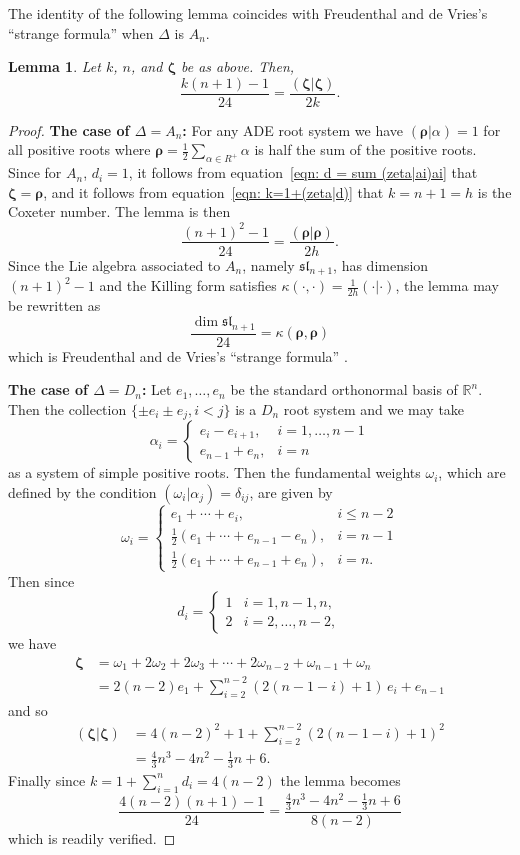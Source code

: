 \documentclass{amsart}
\newtheorem{lemma}[theorem]{Lemma}
\theoremstyle{definition}
\newcommand{\half}{\frac{1}{2}}
\newcommand{\RR} {{\mathbb R}}		%
\newcommand{\zetavec}{\bm{\zeta }}
\newcommand{\rhovec}{\bm{\rho }}
\begin{document}
The identity of the following lemma coincides with Freudenthal and de Vries's
``strange formula'' when $\Delta$ is $A_{n}$. 
\begin{lemma}\label{lem: another strange formula}
Let $k$, $n$, and $\zetavec$ be as above. Then,
\[
\frac{k(n+1)-1}{24} =\frac{(\zetavec |\zetavec )}{2k} . 
\]
\end{lemma}
\begin{proof}
\textbf{The case of $\Delta =A_{n}$:}
For any ADE root system we have $(\rhovec |\alpha )=1$ for all positive
roots where $\rhovec =\half \sum_{\alpha \in R^{+}}\alpha$ is half the
sum of the positive roots. Since for $A_{n}$, $d_{i}=1$, it follows
from equation~\eqref{eqn: d = sum (zeta|ai)ai} that $\zetavec
=\rhovec$, and it follows from equation~\eqref{eqn: k=1+(zeta|d)}
that $k=n+1=h$ is the Coxeter number. The lemma is then
\[
\frac{(n+1)^{2}-1}{24} = \frac{(\rhovec |\rhovec )}{2h}.
\]
Since the Lie algebra associated to $A_{n}$, namely $\mathfrak{sl}_{n+1}$,
has dimension $(n+1)^{2}-1$ and the Killing form satisfies $\kappa
(\cdot ,\cdot )=\frac{1}{2h}(\cdot |\cdot )$, the lemma may be
rewritten as
\[
\frac{\dim \mathfrak{sl}_{n+1}}{24} =\kappa (\rhovec ,\rhovec )
\]
which is Freudenthal and de Vries's ``strange formula''
\cite[47.11]{freudenthal1969linear}.

\bigskip
\textbf{The case of $\Delta =D_{n}$:} Let $e_{1},\dotsc ,e_{n}$ be the
standard orthonormal basis of $\RR^{n}$. Then the collection $\{\pm
e_{i} \pm e_{j}, i<j \}$ is a $D_{n}$ root system and we may take 
\[
\alpha_{i} = \begin{cases}
e_{i}-e_{i+1},& i=1,\dotsc ,n-1\\
e_{n-1}+e_{n},&i=n
\end{cases}
\]
as a system of simple positive roots. Then the fundamental weights
$\omega_{i}$, which are defined by the condition $(\omega_{i}
|\alpha_{j}) = \delta_{ij} $, are given by \cite[Appendix C]{Knapp}
\[
\omega_{i} = \begin{cases}
e_{1}+\dotsb +e_{i},& i\leq n-2\\
\half (e_{1}+\dotsb +e_{n-1}-e_{n}),& i=n-1\\
\half (e_{1}+\dotsb +e_{n-1}+e_{n}),& i=n.
\end{cases}
\]
Then since
\[
d_{i}=\begin{cases}
1&i=1,n-1,n,\\
2&i=2,\dotsc , n-2,
\end{cases}
\]
we have
\begin{align*}
\zetavec & = \omega_{1}+2\omega_{2}+2\omega_{3}+\dotsb +2\omega_{n-2}+\omega_{n-1}+\omega_{n}\\
&= 2(n-2) e_{1} + \sum_{i=2}^{n-2}\left(2(n-1-i)+1 \right)\, e_{i}  +e_{n-1}
\end{align*}
and so
\begin{align*}
(\zetavec |\zetavec ) &= 4(n-2)^{2} + 1 + \sum_{i=2}^{n-2} \left(2(n-1-i)+1 \right)^{2}\\
&= \frac{4}{3}n^{3}-4n^{2}-\frac{1}{3}n+6.
\end{align*}
Finally since $k=1+\sum_{i=1}^{n}d_{i} = 4(n-2)$ the lemma becomes
\[
\frac{4(n-2)(n+1)-1}{24} = \frac{ \frac{4}{3}n^{3}-4n^{2}-\frac{1}{3}n+6}{8(n-2)}
\]
which is readily verified.


\end{proof}
\end{document}
